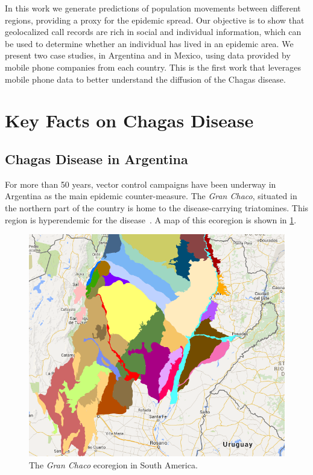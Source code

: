  In this work we generate predictions of population movements between different regions, providing a proxy for the epidemic spread. Our objective is to show that geolocalized call records are rich in social and individual information, which can be used to determine whether an individual has lived in an epidemic area. We present two case studies, in Argentina and in Mexico, using data provided by mobile phone companies from each country. %
This is the first work that leverages mobile phone data to better understand the diffusion of the Chagas disease.




\section{Key Facts on Chagas Disease}

\subsection{Chagas Disease in  Argentina}\label{endemic_zone_argentina}

For more than 50 years, vector control campaigns have been underway in Argentina as the main epidemic counter-measure. The \textit{Gran Chaco}, situated in the northern part of the country is home to the disease-carrying triatomines. This region is hyperendemic for the disease~\cite{OPS2014mapa}. A map of this ecoregion is shown in \cref{fig:granchaco}.

\begin{figure}[ht]
\centering
\includegraphics[width=0.75\columnwidth]{figures/Ambientes_GranChaco_TNC-Argentina/Ambientes_GranChaco_TNC-Argentina.png}
\caption{The \textit{Gran Chaco} ecoregion in South America.%
}
\label{fig:granchaco}
\end{figure}

